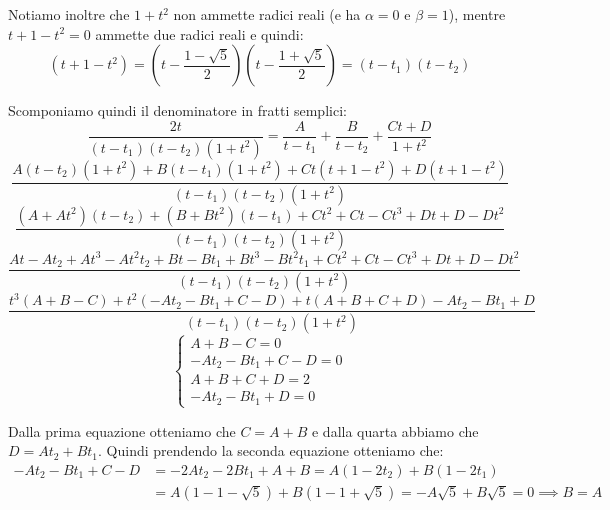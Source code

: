 \documentclass{article}
\begin{document}
\noindent Notiamo inoltre che $1 + t^2$ non ammette radici reali (e ha $\alpha = 0$ e $\beta = 1$), mentre $t + 1 - t^2 = 0$ ammette due radici reali e quindi:
\begin{equation*}
    (t + 1 - t^2) = \left(t - \frac{1 - \sqrt{5}}{2}\right)\left(t-  \frac{1 + \sqrt{5}}{2}\right) = (t - t_1)(t - t_2)
\end{equation*}

\noindent Scomponiamo quindi il denominatore in fratti semplici:
\begin{equation*}
    \frac{2t}{(t - t_1)(t - t_2)(1 + t^2)} = \frac{A}{t - t_1} + \frac{B}{t - t_2} + \frac{Ct + D}{1 + t^2}
\end{equation*}
\begin{equation*}
    \frac{A(t - t_2)(1 + t^2) + B(t - t_1)(1 + t^2) + Ct(t + 1 - t^2) + D(t + 1 - t^2)}{(t - t_1)(t - t_2)(1 + t^2)}
\end{equation*}
\begin{equation*}
    \frac{(A + At^2)(t - t_2) + (B + Bt^2)(t - t_1) + Ct^2 + Ct - Ct^3 + Dt + D - Dt^2}{(t - t_1)(t - t_2)(1 + t^2)}
\end{equation*}
\begin{equation*}
    \frac{At - At_2 + At^3 - At^2t_2 + Bt - Bt_1 + Bt^3 - Bt^2t_1 + Ct^2 + Ct - Ct^3 + Dt + D - Dt^2}{(t - t_1)(t - t_2)(1 + t^2)}
\end{equation*}
\begin{equation*}
    \frac{t^3(A + B - C) + t^2(-At_2 - Bt_1 + C - D) + t(A + B + C + D) - At_2 - Bt_1 + D}{(t - t_1)(t - t_2)(1 + t^2)}
\end{equation*}
\begin{equation*}
    \begin{cases}
        A + B - C = 0 \\
        -At_2 - Bt_1 + C - D = 0 \\
        A + B + C + D = 2 \\
        -At_2 - Bt_1 + D = 0
    \end{cases}
\end{equation*}

\noindent Dalla prima equazione otteniamo che $C = A + B$ e dalla quarta abbiamo che $D = At_2 + Bt_1$. Quindi prendendo la seconda equazione otteniamo che:
\begin{align*}
    -At_2 - Bt_1 + C - D &= -2At_2 - 2Bt_1 + A + B = A(1 - 2t_2) + B(1 - 2t_1) \\
    &= A(1 - 1 - \sqrt{5}) + B(1 - 1 + \sqrt{5})  = -A\sqrt{5} + B\sqrt{5} = 0 \implies B = A
\end{align*}
\end{document}

